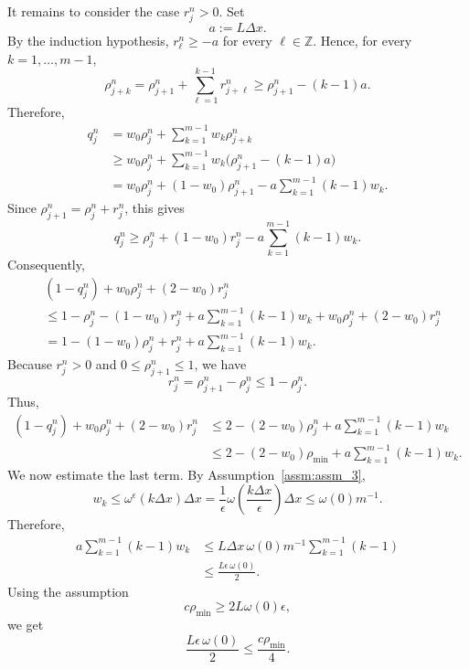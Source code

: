 It remains to consider the case \(r_j^n>0\). Set
\[
    a:=L\Delta x .
\]
By the induction hypothesis, \(r_\ell^n\ge -a\) for every \(\ell\in \mathbb Z\). Hence, for every \(k=1,\dots,m-1\),
\[
    \rho_{j+k}^n
    =
    \rho_{j+1}^n+\sum_{\ell=1}^{k-1} r_{j+\ell}^n
    \ge
    \rho_{j+1}^n-(k-1)a .
\]
Therefore,
\[
    \begin{aligned}
        q_j^n
         & =
        w_0\rho_j^n+\sum_{k=1}^{m-1}w_k\rho_{j+k}^n \\
         & \ge
        w_0\rho_j^n+\sum_{k=1}^{m-1}w_k
        \bigl(\rho_{j+1}^n-(k-1)a\bigr)             \\
         & =
        w_0\rho_j^n+(1-w_0)\rho_{j+1}^n
        -
        a\sum_{k=1}^{m-1}(k-1)w_k .
    \end{aligned}
\]
Since \(\rho_{j+1}^n=\rho_j^n+r_j^n\), this gives
\[
    q_j^n
    \ge
    \rho_j^n+(1-w_0)r_j^n
    -
    a\sum_{k=1}^{m-1}(k-1)w_k .
\]
Consequently,
\[
    \begin{aligned}
         & (1-q_j^n)+w_0\rho_j^n+(2-w_0)r_j^n \\
         & \le
        1-\rho_j^n-(1-w_0)r_j^n
        +a\sum_{k=1}^{m-1}(k-1)w_k
        +w_0\rho_j^n+(2-w_0)r_j^n             \\
         & =
        1-(1-w_0)\rho_j^n+r_j^n
        +a\sum_{k=1}^{m-1}(k-1)w_k .
    \end{aligned}
\]
Because \(r_j^n>0\) and \(0\le \rho_{j+1}^n\le1\), we have
\[
    r_j^n=\rho_{j+1}^n-\rho_j^n\le 1-\rho_j^n .
\]
Thus,
\[
    \begin{aligned}
        (1-q_j^n)+w_0\rho_j^n+(2-w_0)r_j^n
         & \le
        2-(2-w_0)\rho_j^n
        +a\sum_{k=1}^{m-1}(k-1)w_k \\
         & \le
        2-(2-w_0)\rho_{\min}
        +a\sum_{k=1}^{m-1}(k-1)w_k .
    \end{aligned}
\]
We now estimate the last term. By Assumption~\ref{assm:assm_3},
\[
    w_k\le \omega^\epsilon(k\Delta x)\Delta x
    =
    \frac{1}{\epsilon}\omega\!\left(\frac{k\Delta x}{\epsilon}\right)\Delta x
    \le
    \omega(0)m^{-1}.
\]
Therefore,
\[
    \begin{aligned}
        a\sum_{k=1}^{m-1}(k-1)w_k
         & \le
        L\Delta x\,\omega(0)m^{-1}
        \sum_{k=1}^{m-1}(k-1) \\
         & \le
        \frac{L\epsilon\,\omega(0)}{2}.
    \end{aligned}
\]
Using the assumption
\[
    c\rho_{\min}\ge 2L\omega(0)\epsilon ,
\]
we get
\[
    \frac{L\epsilon\,\omega(0)}{2}
    \le
    \frac{c\rho_{\min}}{4}.
\]
